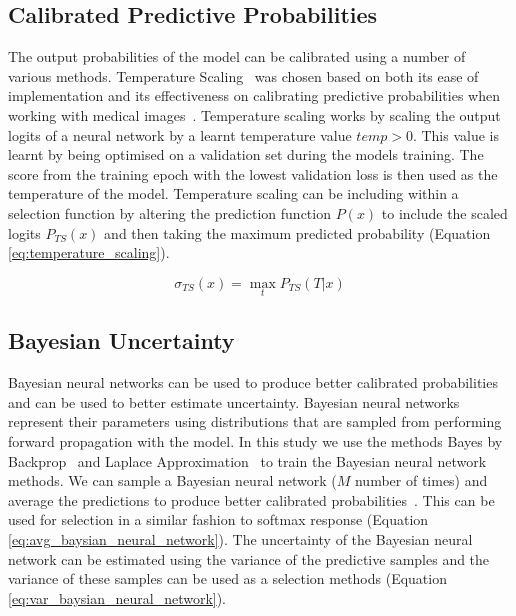 \subsection{Calibrated Predictive Probabilities}
\label{subsec:selective_calibrated_probabilities}
The output probabilities of the model can be calibrated using a number of various methods. Temperature Scaling~\citep{guo2017calibration} was chosen based on both its ease of implementation and its effectiveness on calibrating predictive probabilities when working with medical images~\citep{Liang2020Neural}. Temperature scaling works by scaling the output logits of a neural network by a learnt temperature value $temp > 0$. This value is learnt by being optimised on a validation set during the models training. The score from the training epoch with the lowest validation loss is then used as the temperature of the model. Temperature scaling can be including within a selection function by altering the prediction function $P(x)$ to include the scaled logits $P_{TS}(x)$ and then taking the maximum predicted probability (Equation \ref{eq:temperature_scaling}).

\begin{equation}
	\sigma_{TS}(x) = \max_t P_{TS}(T|x)
	\label{eq:selective_temperature_scaling}
\end{equation}

\subsection{Bayesian Uncertainty}
\label{subsec:selective_uncertainity}
Bayesian neural networks can be used to produce better calibrated probabilities and can be used to better estimate uncertainty. Bayesian neural networks represent their parameters using distributions that are sampled from performing forward propagation with the model. In this study we use the methods Bayes by Backprop~\citep{blundell2015weight} and Laplace Approximation~\citep{mackay1992bayesian} to train the Bayesian neural network methods. We can sample a Bayesian neural network ($M$ number of times) and average the predictions to produce better calibrated probabilities~\citep{jospin2020hands}. This can be used for selection in a similar fashion to softmax response (Equation \ref{eq:avg_baysian_neural_network}). The uncertainty of the Bayesian neural network can be estimated using the variance of the predictive samples and the variance of these samples can be used as a selection methods (Equation \ref{eq:var_baysian_neural_network}).

